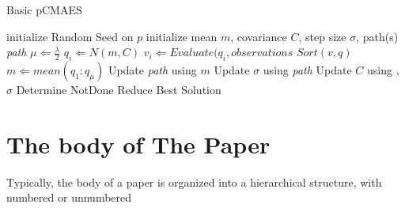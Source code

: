 \documentclass[twocolumn, balance]{article}
\begin{document}
\begin{algorithm}[h!]
\caption{Basic pCMAES}
\label{pCMAES}
\begin{algorithmic}
	\STATE initialize Random Seed on $p$
	\STATE initialize mean $m$, covariance $C$, step size $\sigma$, path(s) \textit{path}
	\STATE $\mu \Leftarrow \frac{\lambda}{2}$
			\STATE $q_i \Leftarrow N(m,C)$
			\STATE $v_i \Leftarrow \textit{Evaluate}(q_i, \textit{observations}$
		\ENDFOR
		\STATE $\textit{Sort}(v,q)$
		\STATE $m \Leftarrow \textit{mean}(q_1:q_\mu)$
		\STATE Update \textit{path} using $m$
		\STATE Update $\sigma$ using \textit{path}
		\STATE Update $C$ using , $\sigma$
		\STATE Determine NotDone
	\ENDWHILE
	\STATE Reduce Best Solution
\ENDFOR
\end{algorithmic}
\end{algorithm}

\section{The body of The Paper}
Typically, the body of a paper is organized
into a hierarchical structure, with numbered or unnumbered
\end{document}

